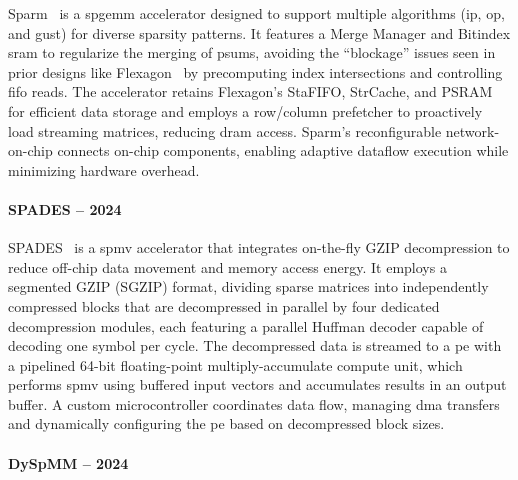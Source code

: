 Sparm~\cite{Luo2024_Sparm} is a \acrshort{spgemm} accelerator designed to support multiple algorithms (\acrlong{ip}, \acrlong{op}, and \acrlong{gust}) for diverse sparsity patterns.
It features a Merge Manager and Bitindex \acrshort{sram} to regularize the merging of \glspl{psum}, avoiding the ``blockage'' issues seen in prior designs like Flexagon~\cite{Munoz-Martinez2023_Flexagon} by precomputing index \glspl{intersection} and controlling \acrshort{fifo} reads.
The accelerator retains Flexagon's StaFIFO, StrCache, and PSRAM for efficient data storage and employs a row/column prefetcher to proactively load streaming matrices, reducing \acrshort{dram} access.
Sparm's reconfigurable network-on-chip connects on-chip components, enabling adaptive dataflow execution while minimizing hardware overhead.

\paragraph{SPADES -- 2024}

SPADES~\cite{Huang2024_SPADES} is a \acrshort{spmv} accelerator that integrates on-the-fly GZIP decompression to reduce off-chip data movement and memory access energy.
It employs a segmented GZIP (SGZIP) format, dividing sparse matrices into independently compressed blocks that are decompressed in parallel by four dedicated decompression modules, each featuring a parallel Huffman decoder capable of decoding one symbol per cycle.
The decompressed data is streamed to a \acrfull{pe} with a pipelined 64-bit floating-point multiply-accumulate compute unit, which performs \acrshort{spmv} using buffered input vectors and accumulates results in an output buffer.
A custom microcontroller coordinates data flow, managing \acrshort{dma} transfers and dynamically configuring the \acrshort{pe} based on decompressed block sizes.

\paragraph{DySpMM -- 2024}

